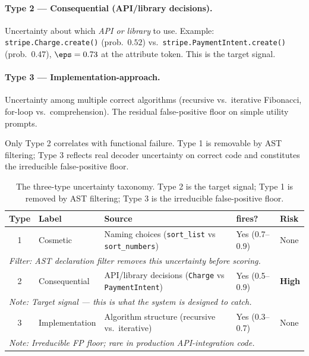 \paragraph{Type 2 --- Consequential (API/library decisions).}
Uncertainty about which \emph{API or library} to use. Example:
\texttt{stripe.Charge.create()} (prob.\ $0.52$) vs.\
\texttt{stripe.PaymentIntent.create()} (prob.\ $0.47$), $\eps = 0.73$
at the attribute token. This is the target signal.

\paragraph{Type 3 --- Implementation-approach.} Uncertainty among
multiple correct algorithms (recursive vs.\ iterative Fibonacci,
for-loop vs.\ comprehension). The residual false-positive floor on
simple utility prompts.

Only Type 2 correlates with functional failure. Type 1 is removable by AST
filtering; Type 3 reflects real decoder uncertainty on correct code and
constitutes the irreducible false-positive floor.

\begin{table}[h]
\centering
\small
\begin{tabular}{c p{2.6cm} p{7cm} p{2.4cm} p{1.2cm}}
\toprule
\textbf{Type} & \textbf{Label} & \textbf{Source} & \textbf{\eps fires?} & \textbf{Risk} \\
\midrule
1 & Cosmetic & Naming choices (\texttt{sort\_list} vs \texttt{sort\_numbers}) & Yes (0.7--0.9) & None \\
\multicolumn{5}{l}{\quad\small\textit{Filter: AST declaration filter removes this uncertainty before scoring.}} \\[4pt]
2 & Consequential & API/library decisions (\texttt{Charge} vs \texttt{PaymentIntent}) & Yes (0.5--0.9) & \textbf{High} \\
\multicolumn{5}{l}{\quad\small\textit{Note: Target signal --- this is what the system is designed to catch.}} \\[4pt]
3 & Implementation & Algorithm structure (recursive vs.\ iterative) & Yes (0.3--0.7) & None \\
\multicolumn{5}{l}{\quad\small\textit{Note: Irreducible FP floor; rare in production API-integration code.}} \\
\bottomrule
\end{tabular}
\caption{The three-type uncertainty taxonomy. Type 2 is the target signal; Type 1 is removed by AST filtering; Type 3 is the irreducible false-positive floor.}
\label{tab:taxonomy}
\end{table}


